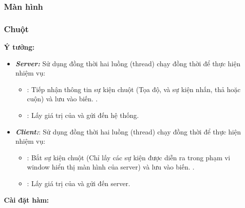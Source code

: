\subsubsection{Màn hình}
\subsubsection{Chuột}
	\textbf{Ý tưởng:}
	\begin{itemize}
		\item \textbf{\textit{Server:}} Sử dụng đồng thời hai luồng (thread) chạy đồng thời để thực hiện nhiệm vụ:
		\begin{itemize}
			\item \textbf{}: Tiếp nhận thông tin sự kiện chuột (Tọa độ, và sự kiện nhấn, thả hoặc cuộn) và lưu vào biến.  \textbf{}.
			\item \textbf{}: Lấy giá trị của \textbf{} và gửi đến hệ thống.
		\end{itemize}
		\item \textbf{\textit{Client:}}: Sử dụng đồng thời hai luồng (thread) chạy đồng thời để thực hiện nhiệm vụ:
			\begin{itemize}
			\item \textbf{}: Bắt sự kiện chuột (Chỉ lấy các sự kiện được diễn ra trong phạm vi window hiển thị màn hình của server) và lưu vào biến.  \textbf{}.
			\item \textbf{}: Lấy giá trị của \textbf{} và gửi đến server.
		\end{itemize}
	\end{itemize}
\textbf{Cài đặt hàm:}
